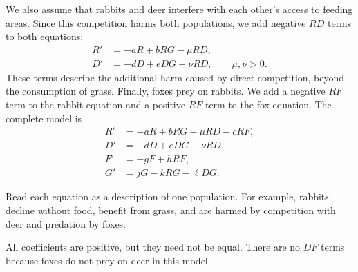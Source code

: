 \documentclass[10pt,letterpaper]{article}
\begin{document}
We also assume that rabbits and deer interfere with
each other's access to feeding areas. Since this
competition harms both populations, we add negative
$RD$ terms to both equations:
\[
\begin{aligned}
R'&=-aR+bRG-\mu RD,\\
D'&=-dD+eDG-\nu RD,
\qquad \mu,\nu>0.
\end{aligned}
\]
These terms describe the additional harm caused by
direct competition, beyond the consumption of grass. Finally, foxes prey on rabbits. We add a negative
$RF$ term to the rabbit equation and a positive
$RF$ term to the fox equation. The complete model is
\[
\boxed{
\begin{aligned}
R'&=-aR+bRG-\mu RD-cRF,\\
D'&=-dD+eDG-\nu RD,\\
F'&=-gF+hRF,\\
G'&=jG-kRG-\ell DG.
\end{aligned}
}
\]

Read each equation as a description of one population.
For example, rabbits decline without food, benefit
from grass, and are harmed by competition with deer
and predation by foxes.

All coefficients are positive, but they need not be equal.
There are no $DF$ terms because foxes do not prey on
deer in this model.
\end{document}
